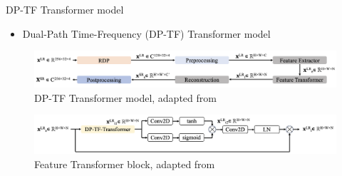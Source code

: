 \documentclass{beamer}
\begin{document}
\begin{frame}[t]{DP-TF Transformer model}
    \begin{itemize}
        \item Dual-Path Time-Frequency (DP-TF) Transformer model \cite{hinderer_blind_2022}
    \end{itemize}

    
    \begin{figure}
        \centering
        \includegraphics[scale=.35]{MA_presentation/figures/dp-tf_transformer_architecture.png}
        \caption{DP-TF Transformer model, adapted from \cite{hinderer_blind_2022}}
    \end{figure}

    \hspace{0.2cm}

    \begin{figure}
        \centering
        \includegraphics[scale=.35]{MA_presentation/figures/feature_transformer_block.png}
        \caption{Feature Transformer block, adapted from \cite{hinderer_blind_2022}}
    \end{figure}

\end{frame}
\end{document}
